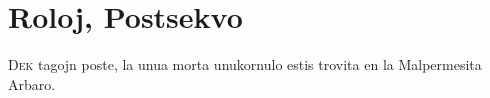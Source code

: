 \chapter{Roloj, Postsekvo}

\lettrine{D}{ek} tagojn poste, la unua morta unukornulo estis trovita en la Malpermesita Arbaro.
